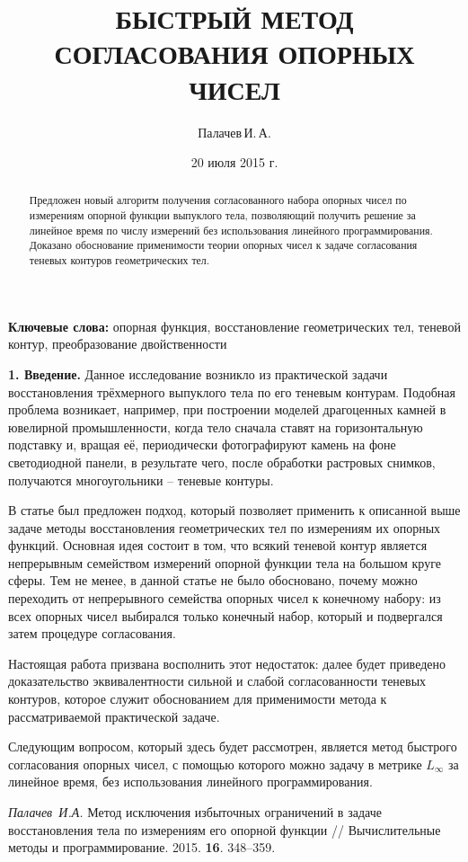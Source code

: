 \documentclass[a4paper, 10pt]{article}
\title{БЫСТРЫЙ МЕТОД СОГЛАСОВАНИЯ ОПОРНЫХ ЧИСЕЛ}
\author{Палачев\,И.\,А.}
\date{20 июля 2015 г.}
\begin{document}
\maketitle

\begin{abstract}
Предложен новый алгоритм получения согласованного набора опорных чисел по
измерениям опорной функции выпуклого тела, позволяющий получить решение за
линейное время по числу измерений без использования линейного программирования.
Доказано обоснование применимости теории опорных чисел к задаче согласования
теневых контуров геометрических тел.
\end{abstract}

\textbf{Ключевые слова:} опорная функция, восстановление геометрических тел,
теневой контур, преобразование двойственности

\textbf{1. Введение.}
Данное исследование возникло из практической задачи восстановления трёхмерного
выпуклого тела по его теневым контурам. Подобная проблема возникает, например,
при построении моделей драгоценных камней в ювелирной промышленности, когда
тело сначала ставят на горизонтальную подставку и, вращая её, периодически
фотографируют камень на фоне светодиодной панели, в результате чего, после
обработки растровых снимков, получаются многоугольники -- теневые контуры.

В статье \cite{palachev} был предложен подход, который позволяет применить к
описанной выше задаче методы восстановления геометрических тел по измерениям их
опорных функций. Основная идея состоит в том, что всякий теневой контур является
непрерывным семейством измерений опорной функции тела на большом круге сферы.
Тем не менее, в данной статье не было обосновано, почему можно переходить от
непрерывного семейства опорных чисел к конечному набору: из всех опорных чисел
выбирался только конечный набор, который и подвергался затем процедуре
согласования.

Настоящая работа призвана восполнить этот недостаток: далее будет приведено
доказательство эквивалентности сильной и слабой согласованности теневых
контуров, которое служит обоснованием для применимости метода к рассматриваемой
практической задаче.

Следующим вопросом, который здесь будет рассмотрен, является метод быстрого
согласования опорных чисел, с помощью которого можно задачу в метрике
$L_{\infty}$ за линейное время, без использования линейного программирования.



\begin{thebibliography}{50}

\emph{Палачев~И.А.}
Метод исключения избыточных ограничений в задаче восстановления тела по
измерениям его опорной функции //
Вычислительные методы и программирование.
2015.
\textbf{16}.
348--359.

\end{thebibliography}
\end{document}
